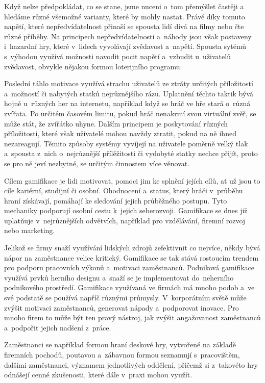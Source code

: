 \documentclass[twoside, 12pt]{article}
\begin{document}
Když nelze předpokládat, co se stane, jsme nuceni o~tom přemýšlet častěji a~
hledáme různé všemožné varianty, které by mohly nastat.
Právě díky tomuto napětí, které nepředvídatelnost přinaší se spousta lidí
dívá na filmy nebo čte různé příběhy.
Na principech nepředvídatelnosti a~náhody jsou však postaveny i~hazardní hry,
které v~lidech vyvolávají zvědavost a~napětí.
Spousta sytémů s~výhodou využívá možnosti navodit pocit napětí
a~vzbudit u~uživatelů zvědavost,
obvykle nějakou formou loterijního programu.

Poslední táhlo motivace využívá strachu uživatelů ze ztráty určitých příložitostí
a~možností či nabytých statků nejrůznějšího rázu.
Uplatnění těchto taktik bývá hojně u~různých her na internetu,
například když se hráč ve hře stará o~různá zvířata.
Po určitém časovém limitu, pokud hráč nenakrmí svou virtuální zvěř,
se může stát, že zvířátko uhyne.
Dalším principem je poskytování různých příložitosti,
které však uživatelé mohou navždy ztratit,
pokud na ně ihned nezareagují.
Těmito způsoby systémy vyvíjejí na uživatele poměrně velký tlak
a~spousta z~nich o~nejrůznější přílěžitosti či vydobyté statky nechce přijít,
proto se pro ně jeví nezbytné, se určitým činnostem více věnovat.


Cílem gamifikace je lidi motivovat,
pomoci jim ke splnění jejích cílů, ať už jsou to cíle kariérní, studijní či osobní.
Ohodnocení a~status, který hráči v~průběhu hraní získávají,
pomáhají ke sledování jejich průběžného postupu.
Tyto mechaniky podporují osobní cestu k~jejich seberozvoji.
Gamifikace se dnes již uplatňuje v~nejrůznějších odvětvích,
například pro vzdělávání, firemní rozvoj nebo marketing.



Jelikož se firmy snaží využívání lidských zdrojů zefektivnit co nejvíce,
někdy bývá nápor na zaměstnance velice kritický.
Gamifikace se tak stává rostoucím trendem pro podporu pracovních výkonů
a~motivaci zaměstnanců.
Podniková gamifikace využívá prvků herního designu a~snaží se
je implementovat do~neherního podnikového prostředí.
Gamifikace využívaná ve firmách
má mnoho podob a~ve své podstatě se používá napříč různými průmysly.
V~korporátním světě může zvýšit motivaci zaměstnanců, generovat nápady a~podporovat inovace.
Pro mnoho firem to může být ten pravý nástroj, jak zvýšit angažovanost zaměstnanců
a~podpořit jejich nadšení z~práce.

\par
Zaměstnanci se například formou hraní deskové hry, vytvořené na základě firemních pochodů,
poutavou a~zábavnou formou seznamují s~pracovištěm, dalšími zaměstnanci,
významem jednotlivých oddělení,
přičemž si z~takovéto hry odnášejí cenné zkušenosti, které dále v~praxi mohou využít.
\end{document}
